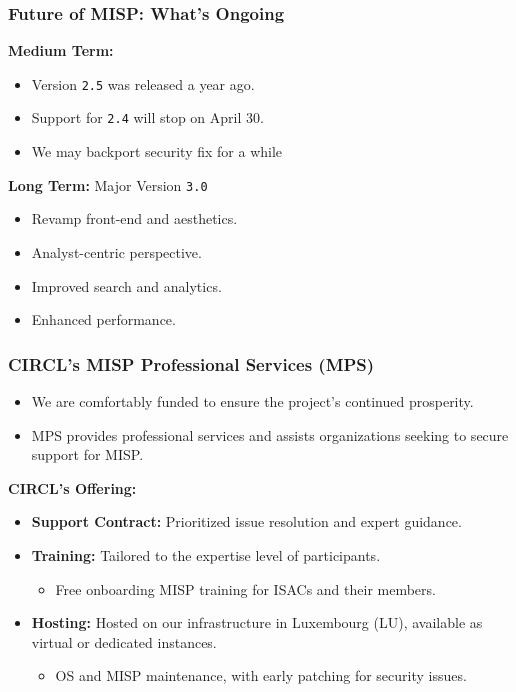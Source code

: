 \begin{frame}
    \frametitle{Future of MISP: What's Ongoing}
    \begin{minipage}[t]{0.5\textwidth}
    \textbf{Medium Term:}
    \begin{itemize}
        \item Version \texttt{2.5} was released a year ago.
        \item Support for \texttt{2.4} will stop on April 30.
        \item We may backport security fix for a while
    \end{itemize}
    \end{minipage}%
    \begin{minipage}[t]{0.5\textwidth}
    \textbf{Long Term:} Major Version \texttt{3.0}
    \begin{itemize}
        \item Revamp front-end and aesthetics.
        \item Analyst-centric perspective.
        \item Improved search and analytics.
        \item Enhanced performance.
    \end{itemize}
    \end{minipage}%
\end{frame}

\begin{frame}
    \frametitle{CIRCL's MISP Professional Services (MPS)}
    \begin{itemize}
        \item We are comfortably funded to ensure the project's continued prosperity.
        \item MPS provides professional services and assists organizations seeking to secure support for MISP.
    \end{itemize}
    \vspace{1em}
    \textbf{CIRCL's Offering:}
    \begin{itemize}
        \item \textbf{Support Contract:} Prioritized issue resolution and expert guidance.
        \item \textbf{Training:} Tailored to the expertise level of participants.
            \begin{itemize}
                \item {\small Free onboarding MISP training for ISACs and their members.}
            \end{itemize}
        \item \textbf{Hosting:} Hosted on our infrastructure in Luxembourg (LU), available as virtual or dedicated instances.
            \begin{itemize}
                \item {\small OS and MISP maintenance, with early patching for security issues.}
            \end{itemize}
    \end{itemize}
\end{frame}

